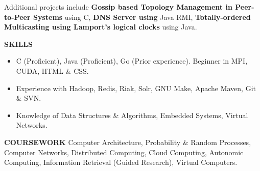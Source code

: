 \documentclass[10pt, letterpaper]{article}
\begin{document}
Additional projects include 
\textbf{Gossip based Topology Management in Peer-to-Peer Systems} using C,  
\textbf{DNS Server using} Java RMI, 
\textbf{Totally-ordered Multicasting using Lamport's logical clocks} using Java.

\textbf{SKILLS}
\smallskip 
\begin{itemize}
    \item C (Proficient), Java (Proficient), Go (Prior experience). Beginner in MPI, CUDA, HTML \& CSS.
    \item Experience with Hadoop, Redis, Riak, Solr, GNU Make, Apache Maven, Git \& SVN.
    \item Knowledge of Data Structures \& Algorithms, Embedded Systems, Virtual Networks.
\end{itemize} 

\textbf{COURSEWORK}
\smallskip 
\newline
Computer Architecture, Probability \& Random Processes, Computer Networks, 
Distributed Computing, Cloud Computing, Autonomic Computing, Information Retrieval (Guided Research), Virtual Computers.
\end{document}
